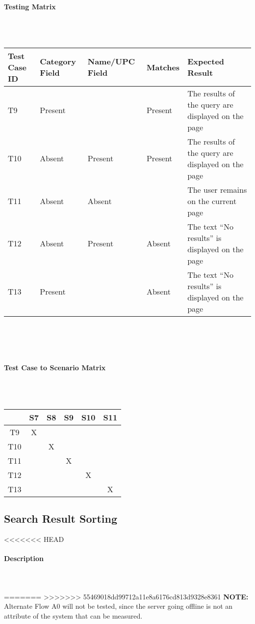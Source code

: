 \documentclass{article}
\begin{document}
\paragraph{Testing Matrix}~\\ \\
\begin{tabular}{ p{0.8in}  p{0.5in} p{0.7in}  p{0.5in}  p{3in} }
\hline
Test Case ID & Category Field & Name/UPC Field & Matches & Expected Result\\
\hline
\hline
T9 & Present &  & Present & The results of the query are displayed on the page\\
\hline
T10 & Absent & Present & Present & The results of the query are displayed on the page\\
\hline
T11 & Absent & Absent &  & The user remains on the current page\\
\hline
T12 & Absent & Present & Absent & The text ``No results'' is displayed on the page\\
\hline
T13 & Present &  & Absent & The text ``No results'' is displayed on the page\\
\hline
\end{tabular}\\
~\\
~\\
\paragraph{Test Case to Scenario Matrix}~\\ \\
\begin{tabular}{ | c || c | c | c | c | c | }
\hline
    & S7  & S8  & S9  & S10 & S11 \\
\hline
\hline
T9  &  X  &     &     &     &     \\
\hline
T10 &     &  X  &     &     &     \\
\hline
T11 &     &     &  X  &     &     \\
\hline
T12 &     &     &     &  X  &     \\
\hline
T13 &     &     &     &     &  X  \\
\hline
\end{tabular}

\subsection{Search Result Sorting}
<<<<<<< HEAD
\paragraph{Description}
~\\ \\
=======
>>>>>>> 55469018dd99712a11e8a6176cd813d9328e8361
\textbf{NOTE:} Alternate Flow A0 will not be tested, since the server going offline is not an attribute of the system that can be measured.
\end{document}
